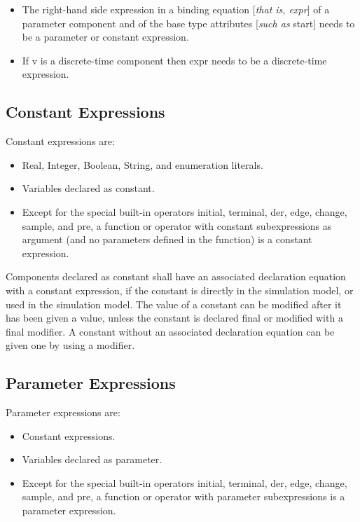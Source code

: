 \documentclass[10pt,a4paper]{report}
\def\doublelabel#1{\label{#1}\hypertarget{#1}{}}
\begin{document}
\begin{itemize}
\item
  The right-hand side expression in a binding equation {[}\emph{that is,
  expr}{]} of a parameter component and of the base type attributes
  {[}\emph{such as} start{]} needs to be a parameter or constant
  expression.
\item
  If v is a discrete-time component then expr needs to be a
  discrete-time expression.
\end{itemize}

\subsection{Constant Expressions}\doublelabel{constant-expressions}
Constant expressions are:

\begin{itemize}
\item
  Real, Integer, Boolean, String, and enumeration literals.
\item
  Variables declared as constant.
\item
  Except for the special built-in operators initial, terminal, der,
  edge, change, sample, and pre, a function or operator with constant
  subexpressions as argument (and no parameters defined in the function)
  is a constant expression.
\end{itemize}

Components declared as constant shall have an associated declaration equation with
a constant expression, if the constant is directly in the simulation
model, or used in the simulation model. The value of a constant can be
modified after it has been given a value, unless the constant is
declared final or modified with a final modifier. A constant without an
associated declaration equation can be given one by using a modifier.

\subsection{Parameter Expressions}\doublelabel{parameter-expressions}

Parameter expressions are:

\begin{itemize}
\item
  Constant expressions.
\item
  Variables declared as parameter.
\item
  Except for the special built-in operators initial, terminal, der,
  edge, change, sample, and pre, a function or operator with parameter
  subexpressions is a parameter expression.
\end{itemize}
\end{document}
